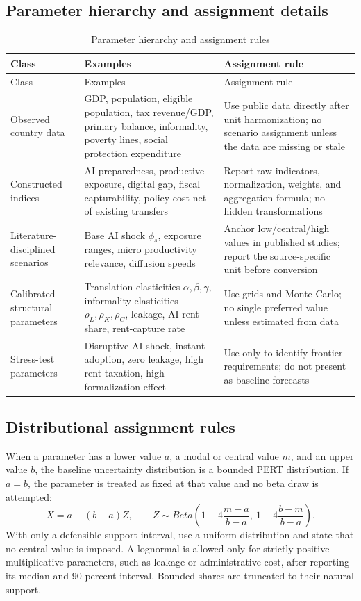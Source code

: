 \documentclass[11pt,a4paper]{article}
\begin{document}
\subsection{Parameter hierarchy and assignment details}

\begin{longtable}{p{}p{}p{}}
\caption{Parameter hierarchy and assignment rules}\label{tab:parameter_hierarchy}\\
\toprule
Class & Examples & Assignment rule \\
\midrule
\endfirsthead
\toprule
Class & Examples & Assignment rule \\
\midrule
\endhead
Observed country data & GDP, population, eligible population, tax revenue/GDP, primary balance, informality, poverty lines, social protection expenditure & Use public data directly after unit harmonization; no scenario assignment unless the data are missing or stale \\
Constructed indices & AI preparedness, productive exposure, digital gap, fiscal capturability, policy cost net of existing transfers & Report raw indicators, normalization, weights, and aggregation formula; no hidden transformations \\
Literature-disciplined scenarios & Base AI shock $\phi_s$, exposure ranges, micro productivity relevance, diffusion speeds & Anchor low/central/high values in published studies; report the source-specific unit before conversion \\
Calibrated structural parameters & Translation elasticities $\alpha,\beta,\gamma$, informality elasticities $\rho_L,\rho_K,\rho_C$, leakage, AI-rent share, rent-capture rate & Use grids and Monte Carlo; no single preferred value unless estimated from data \\
Stress-test parameters & Disruptive AI shock, instant adoption, zero leakage, high rent taxation, high formalization effect & Use only to identify frontier requirements; do not present as baseline forecasts \\
\bottomrule
\end{longtable}
\subsection{Distributional assignment rules}

When a parameter has a lower value $a$, a modal or central value $m$, and an upper value $b$, the baseline uncertainty distribution is a bounded PERT distribution. If $a=b$, the parameter is treated as fixed at that value and no beta draw is attempted:
\begin{equation}
    X=a+(b-a)Z,
    \qquad
    Z\sim Beta\left(1+4\frac{m-a}{b-a},\ 1+4\frac{b-m}{b-a}\right).
\end{equation}
With only a defensible support interval, use a uniform distribution and state that no central value is imposed. A lognormal is allowed only for strictly positive multiplicative parameters, such as leakage or administrative cost, after reporting its median and 90 percent interval. Bounded shares are truncated to their natural support.
\end{document}
